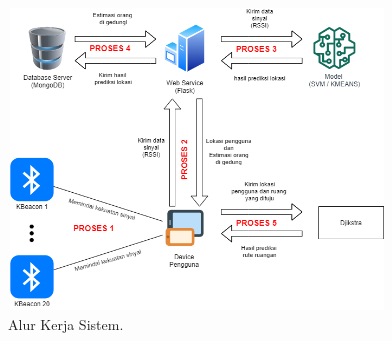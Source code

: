 \begin{figure}[H]
	\centering
	\includegraphics[width=10cm, height=8cm]{gambar/perancangansistem.png}
	\caption{Alur Kerja Sistem.}
	\label{alur-kerja-sistem}
\end{figure}

